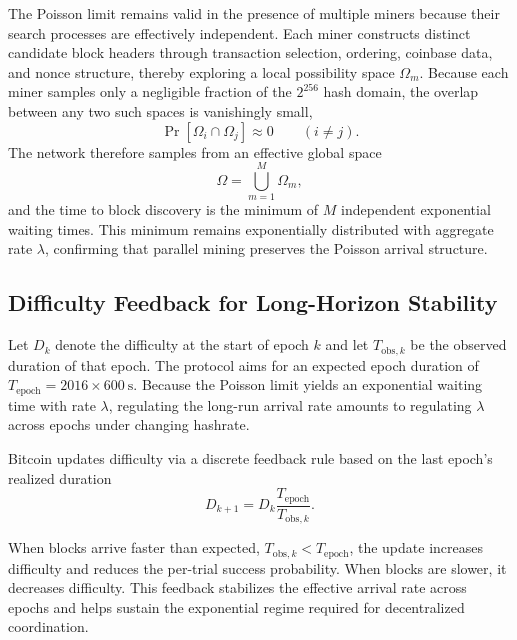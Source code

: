 \documentclass[conference]{IEEEtran}
\begin{document}
The Poisson limit remains valid in the presence of multiple miners because their
search processes are effectively independent. Each miner constructs distinct
candidate block headers through transaction selection, ordering, coinbase data,
and nonce structure, thereby exploring a local possibility space $\Omega_m$.
Because each miner samples only a negligible fraction of the $2^{256}$ hash
domain, the overlap between any two such spaces is vanishingly small,
\begin{equation}
\Pr[\Omega_i \cap \Omega_j] \approx 0 \qquad (i \neq j).
\end{equation}
The network therefore samples from an effective global space
\begin{equation}
\Omega = \bigcup_{m=1}^M \Omega_m,
\end{equation}
and the time to block discovery is the minimum of $M$ independent exponential
waiting times. This minimum remains exponentially distributed with aggregate
rate $\lambda$, confirming that parallel mining preserves the Poisson arrival
structure. 

\subsection{Difficulty Feedback for Long-Horizon Stability}

Let $D_k$ denote the difficulty at the start of epoch $k$ and let
$T_{\mathrm{obs},k}$ be the observed duration of that epoch. The protocol aims
for an expected epoch duration of $T_{\mathrm{epoch}} = 2016 \times 600 \ \mathrm{s}$.
Because the Poisson limit yields an exponential waiting time with rate
$\lambda$, regulating the long-run arrival rate amounts to regulating $\lambda$
across epochs under changing hashrate.

Bitcoin updates difficulty via a discrete feedback rule based on the last
epoch's realized duration \cite{bitcoincore2025pow}
\begin{equation}
D_{k+1}
= D_k \frac{T_{\mathrm{epoch}}}{T_{\mathrm{obs},k}}.
\label{eq:difficulty-update}
\end{equation}

When blocks arrive faster than expected, $T_{\mathrm{obs},k} < T_{\mathrm{epoch}}$,
the update increases difficulty and reduces the per-trial success probability.
When blocks are slower, it decreases difficulty. This feedback stabilizes the
effective arrival rate across epochs and helps sustain the exponential regime
required for decentralized coordination.
\end{document}
